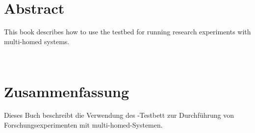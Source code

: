 
\chapter*{Abstract}

This book describes how to use the  testbed for running
research experiments with multi-homed systems.


~\\ \dckeywordsen


%


\chapter*{Zusammenfassung}

Dieses Buch beschreibt die Verwendung des -Testbett zur Durchführung von Forschungsexperimenten mit multi-homed-Systemen.


~\\ \dckeywordsde
